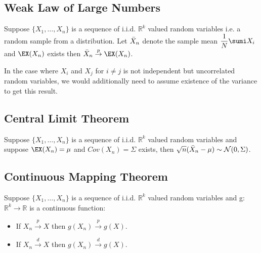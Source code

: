 \subsection{Weak Law of Large Numbers}

Suppose $\{X_1, \dots, X_n\}$ is a sequence of i.i.d. $\mathbb{R}^k$ valued random variables  i.e. a random sample from a distribution.
Let $\Bar{X}_n$ denote the sample mean $\dfrac{1}{N}\sumi X_i$ and $\EX(X_n)$ exists then $\Bar{X}_n \overset{p}{\to} \EX(X_n)$. 

In the case where $X_i$ and $X_j$ for $i \neq j$ is not independent
but uncorrelated random variables, we would additionally need to assume existence of the variance to get this result.


\subsection{Central Limit Theorem}

Suppose $\{X_1, \dots, X_n\}$ is a sequence of i.i.d. $\mathbb{R}^k$ valued random variables and suppose $\EX(X_n) = \mu$ and $Cov(X_n)= \Sigma$ exists, then $\sqrt{n}(\Bar{X}_n - \mu) \sim \mathcal{N}(0,\Sigma)$.

\subsection{Continuous Mapping Theorem}

Suppose $\{X_1, \dots, X_n\}$ is a sequence of i.i.d. $\mathbb{R}^k$ valued random variables and g: $\mathbb{R}^k \rightarrow \mathbb{R} $ is a continuous function:
\begin{itemize}
    \item If $X_n \overset{p}{\to} X$ then  $g(X_n) \overset{p}{\to} g(X)$.
    \item If $X_n \overset{d}{\to} X$ then  $g(X_n) \overset{d}{\to} g(X)$.
\end{itemize}
